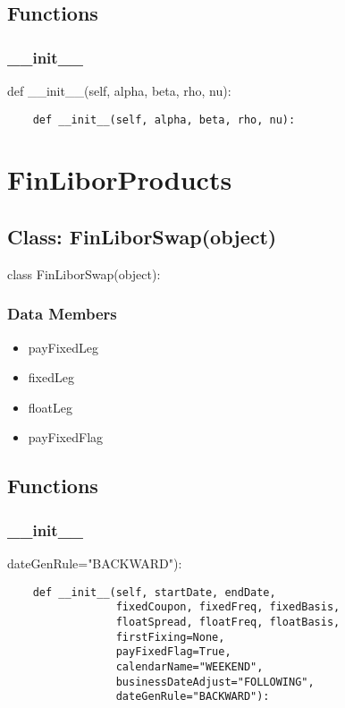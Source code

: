 \documentclass[twoside,11pt]{book}
\begin{document}
\subsection*{Functions}

\subsubsection*{{\bf \_\_init\_\_}}
def \_\_init\_\_(self, alpha, beta, rho, nu): 

\begin{lstlisting}
    def __init__(self, alpha, beta, rho, nu):
\end{lstlisting}

\newpage
\section{FinLiborProducts}

\subsection*{Class: FinLiborSwap(object)}
class FinLiborSwap(object): 

\subsubsection*{Data Members}
\begin{itemize}
\item{payFixedLeg}
\item{fixedLeg}
\item{floatLeg}
\item{payFixedFlag}
\end{itemize}

\subsection*{Functions}

\subsubsection*{{\bf \_\_init\_\_}}
dateGenRule="BACKWARD"): 

\begin{lstlisting}
    def __init__(self, startDate, endDate,
                 fixedCoupon, fixedFreq, fixedBasis,
                 floatSpread, floatFreq, floatBasis,
                 firstFixing=None,
                 payFixedFlag=True,
                 calendarName="WEEKEND",
                 businessDateAdjust="FOLLOWING",
                 dateGenRule="BACKWARD"):
\end{lstlisting}
\end{document}
